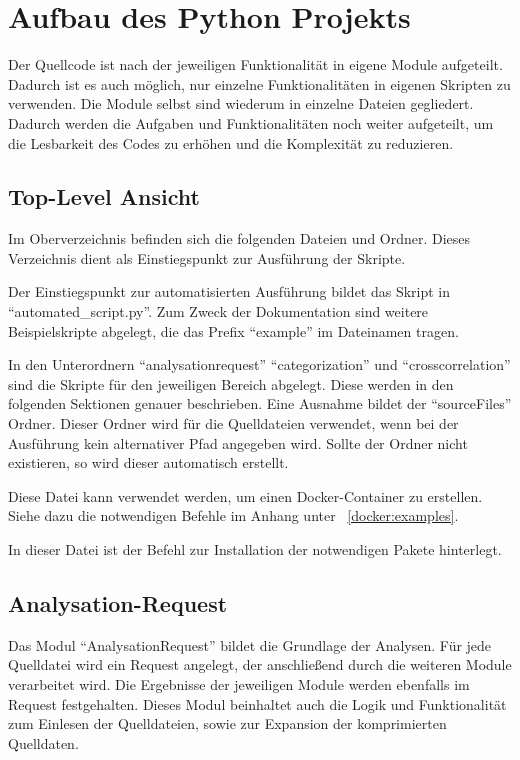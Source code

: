 \section{Aufbau des Python Projekts}
Der Quellcode ist nach der jeweiligen Funktionalität in eigene Module aufgeteilt.
Dadurch ist es auch möglich, nur einzelne Funktionalitäten in eigenen Skripten zu verwenden.
Die Module selbst sind wiederum in einzelne Dateien gegliedert.
Dadurch werden die Aufgaben und Funktionalitäten noch weiter aufgeteilt, um die Lesbarkeit des Codes zu erhöhen und die Komplexität zu reduzieren.

\subsection{Top-Level Ansicht}
Im Oberverzeichnis befinden sich die folgenden Dateien und Ordner. Dieses Verzeichnis dient als Einstiegspunkt zur Ausführung der Skripte.
\begin{description}[style=nextline]
	\item[Skriptdateien] Der Einstiegspunkt zur automatisierten Ausführung bildet das Skript in \enquote{automated\_script.py}. Zum Zweck der Dokumentation sind weitere Beispielskripte abgelegt, die das Prefix \enquote{example} im Dateinamen tragen.
	\item[Unterordner] In den Unterordnern \enquote{analysationrequest} \enquote{categorization} und \enquote{crosscorrelation} sind die Skripte für den jeweiligen Bereich abgelegt. Diese werden in den folgenden Sektionen genauer beschrieben. Eine Ausnahme bildet der \enquote{sourceFiles} Ordner. Dieser Ordner wird für die Quelldateien verwendet, wenn bei der Ausführung kein alternativer Pfad angegeben wird. Sollte der Ordner nicht existieren, so wird dieser automatisch erstellt.
	\item[Docker-File] Diese Datei kann verwendet werden, um einen Docker-Container zu erstellen. Siehe dazu die notwendigen Befehle im Anhang unter ~\ref{docker:examples}.
	\item[Dependencies.txt] In dieser Datei ist der Befehl zur Installation der notwendigen Pakete hinterlegt.
\end{description}

\subsection{Analysation-Request}
Das Modul \enquote{AnalysationRequest} bildet die Grundlage der Analysen.
Für jede Quelldatei wird ein Request angelegt, der anschließend durch die weiteren Module verarbeitet wird.
Die Ergebnisse der jeweiligen Module werden ebenfalls im Request festgehalten.
Dieses Modul beinhaltet auch die Logik und Funktionalität zum Einlesen der Quelldateien, sowie zur Expansion der komprimierten Quelldaten.


